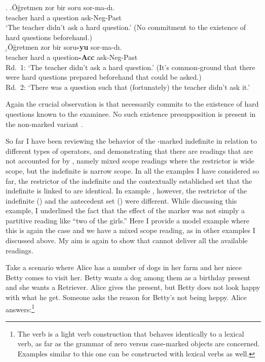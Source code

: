 \documentclass[11pt,a4paper]{article}
\begin{document}
\ex.
\a.\label{sorunegz}Öğretmen zor bir soru sor-ma-dı.\\
teacher hard a question ask-Neg-Past\\
`The teacher didn't ask a hard question.' (No commitment to the
existence of hard questions beforehand.)\\
\b.\label{sorunega}Öğretmen zor bir soru{\bf-yu} sor-ma-dı.\\
teacher hard a question{\bf-Acc} ask-Neg-Past\\
Rd.\ 1: `The teacher didn't ask a hard question.' (It's
common-ground that there were hard questions prepared beforehand that could be asked.)\\
Rd.\ 2: `There was a question such that (fortunately) the teacher didn't ask
it.'

Again the crucial observation is that  necessarily commits to
the existence of hard questions known to the examinee. No such existence
presupposition is present in the non-marked variant .

So far I have been reviewing the behavior of the \acc-marked indefinite in
relation to different types of operators, and demonstrating that there are
readings that are not accounted for by , namely mixed scope
readings where the restrictor is wide scope, but the indefinite is narrow
scope. In all the examples I have considered so far, the restrictor of the
indefinite and the contextually established set that the indefinite is linked
to are identical. In  example , however, the restrictor
of the indefinite () and the antecedent set () were
different. While discussing this example, I underlined the fact that the effect
of the marker was not simply a partitive reading like ``two of the girls.''
Here I provide a model example where this is again the case and we have a mixed
scope reading, as in other examples I discussed above. My aim is again to show
that  cannot deliver all the available readings. 
 
Take a scenario where Alice has a number of dogs in her farm and her niece
Betty comes to visit her. Betty wants a dog among them as a birthday present
and she wants a Retriever. Alice gives the present, but Betty does not look
happy with what he get. Someone asks the reason for Betty's not being heppy.
Alice answers:\footnote{The verb  is a light verb
construction that behaves identically to a lexical verb, as far as the grammar
of zero versus case-marked objects are concerned. Examples similar to this one
can be constructed with lexical verbs as well.}
\end{document}
